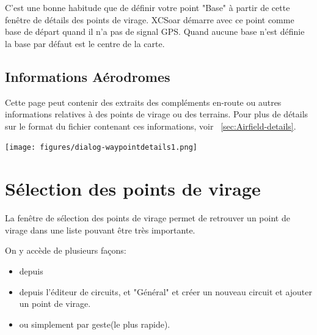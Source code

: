 C'est une bonne habitude que de définir votre point "Base" à partir de cette fenêtre de détails des points de virage. XCSoar démarre avec ce point comme  base de départ quand il n'a pas de signal GPS. Quand aucune base n'est définie la base par défaut est le centre de la carte.

\subsection*{Informations Aérodromes}
Cette page peut contenir des extraits des compléments en-route ou autres informations relatives à des points de virage ou des terrains. Pour plus de détails sur le format du fichier contenant ces informations, voir ~\ref{sec:Airfield-details}.

\begin{center}
\texttt{[image: figures/dialog-waypointdetails1.png]}
\end{center}


\section{Sélection des points de virage}\label{sec:waypoint-selector-dialog}
La fenêtre de sélection des points de virage permet de retrouver un point de virage dans une liste pouvant être très importante. 

On y accède de plusieurs façons:
\begin{itemize}
\item depuis  \blink{}
\item depuis l'éditeur de circuits,  \blink{} et "Général" et créer un nouveau circuit et ajouter un point de virage.
\item ou simplement par geste(le plus rapide).
\end{itemize}

